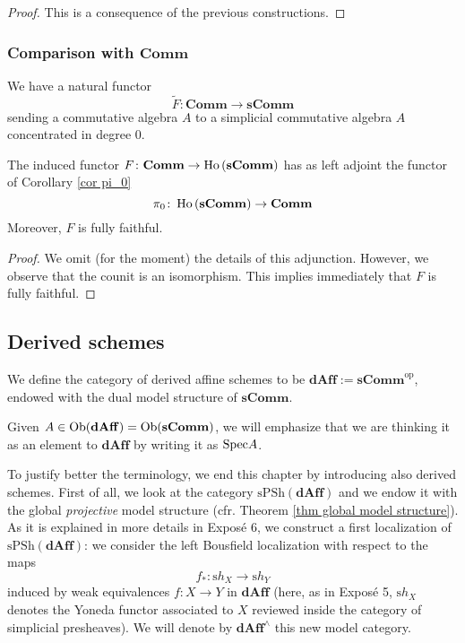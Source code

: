 \begin{refsection}
\begin{proof}
This is a consequence of the previous constructions.
\end{proof}

\subsubsection{Comparison with $\mathbf{Comm}$}

We have a natural functor
\[
\widetilde{F} \colon \mathbf{Comm} \to \mathbf{sComm}
\]
sending a commutative algebra $A$ to a simplicial commutative algebra $A$ concentrated in degree $0$.

\begin{lemma}
The induced functor $F \colon \mathbf{Comm} \to \operatorname{\mathrm{Ho} \,}(\mathbf{sComm})$ has as left adjoint the functor of Corollary \ref{cor pi_0}
\[
\pi_0 \colon \operatorname{\mathrm{Ho} \,}(\mathbf{sComm}) \to \mathbf{Comm}
\]
Moreover, $F$ is fully faithful.
\end{lemma}

\begin{proof}
We omit (for the moment) the details of this adjunction. However, we observe that the counit is an isomorphism. This implies immediately that $F$ is fully faithful.
\end{proof}

\subsection{Derived schemes}

\begin{defin}
We define the category of derived affine schemes to be $\mathbf{dAff} := \mathbf{sComm}^{\mathrm{op}}$, endowed with the dual model structure of $\mathbf{sComm}$.
\end{defin}

\begin{notation}
Given $A \in \operatorname{Ob}(\mathbf{dAff}) = \operatorname{Ob}(\mathbf{sComm})$, we will emphasize that we are thinking it as an element to $\mathbf{dAff}$ by writing it as $\mathrm{Spec} A$.
\end{notation}

To justify better the terminology, we end this chapter by introducing also derived schemes. First of all, we look at the category $\mathrm{sPSh}(\mathbf{dAff})$ and we endow it with the global \emph{projective} model structure (cfr. Theorem \ref{thm global model structure}). As it is explained in more details in Expos\'e 6, we construct a first localization of $\mathrm{sPSh}(\mathbf{dAff})$: we consider the left Bousfield localization with respect to the maps
\[
f_* \colon \mathrm s h_X \to \mathrm s h_Y
\]
induced by weak equivalences $f \colon X \to Y$ in $\mathbf{dAff}$ (here, as in Expos\'e 5, $\mathrm sh_X$ denotes the Yoneda functor associated to $X$ reviewed inside the category of simplicial presheaves). We will denote by $\mathbf{dAff}^{\wedge}$ this new model category.


\end{refsection}
